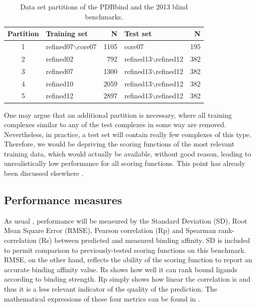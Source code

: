 \begin{table}
\caption{Data set partitions of the PDBbind and the 2013 blind benchmarks.}
\label{rfscore3:partitions}
\begin{tabular}{clrlr}
\hline
Partition & Training set & N & Test set & N\\
\hline
1 & refined07$\backslash$core07 & 1105 & core07                         & 195\\
2 & refined02                   &  792 & refined13$\backslash$refined12 & 382\\
3 & refined07                   & 1300 & refined13$\backslash$refined12 & 382\\
4 & refined10                   & 2059 & refined13$\backslash$refined12 & 382\\
5 & refined12                   & 2897 & refined13$\backslash$refined12 & 382\\
\hline
\end{tabular}
\end{table}

One may argue that an additional partition is necessary, where all training complexes similar to any of the test complexes in some way are removed. Nevertheless, in practice, a test set will contain really few complexes of this type. Therefore, we would be depriving the scoring functions of the most relevant training data, which would actually be available, without good reason, leading to unrealistically low performance for all scoring functions. This point has already been discussed elsewhere \citep{908,1432}.

\subsection{Performance measures}

As usual \citep{1313}, performance will be measured by the Standard Deviation (SD), Root Mean Square Error (RMSE), Pearson correlation (Rp) and Spearman rank-correlation (Rs) between predicted and measured binding affinity. SD is included to permit comparison to previously-tested scoring functions on this benchmark. RMSE, on the other hand, reflects the ability of the scoring function to report an accurate binding affinity value. Rs shows how well it can rank bound ligands according to binding strength. Rp simply shows how linear the correlation is and thus it is a less relevant indicator of the quality of the prediction. The mathematical expressions of these four metrics can be found in \citep{1432}.

